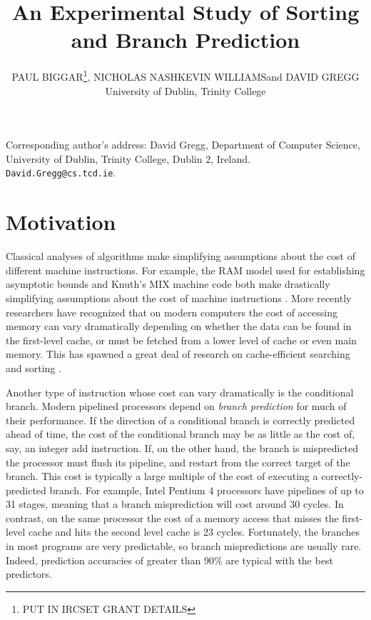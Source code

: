 \documentclass[acmtocl]{acmtrans2m}
\title{An Experimental Study of Sorting and Branch Prediction}
\author{
PAUL BIGGAR\footnote[1]{PUT IN IRCSET GRANT DETAILS}, NICHOLAS NASH\footnotemark[1] KEVIN WILLIAMS\footnotemark[1] and DAVID GREGG
\\University of Dublin, Trinity College
}
\begin{document}
\begin{bottomstuff}
Corresponding author's address: David Gregg, Department of Computer
Science, University of Dublin, Trinity College, Dublin 2, Ireland. {\tt
David.Gregg@cs.tcd.ie}.
\end{bottomstuff}

\maketitle

\section{Motivation}
Classical analyses of algorithms make simplifying assumptions about
the cost of different machine instructions. For example, the RAM model used for 
establishing asymptotic bounds and Knuth's MIX 
machine code both make drastically simplifying assumptions about the cost of
machine instructions \cite{KnuthVol1_97}. 
More
recently researchers have recognized that on modern computers the cost
of accessing memory can vary dramatically depending on whether the
data can be found in the first-level cache, or must be fetched from a
lower level of cache or even main memory.  This has spawned a great
deal of research on cache-efficient searching and sorting \cite{Nyberg+94,Agarwal96,LaMarca96b,LaMarca96a,LaMarca97,Xiao+00,Rahman+01,Wickremesinghe+02}.

Another type of instruction whose cost can vary dramatically is the
conditional branch. Modern pipelined processors depend on \emph{branch
prediction} for much of their performance.  If the direction of a
conditional branch is correctly predicted ahead of time, the cost of
the conditional branch may be as little as the cost of, say, an
integer add instruction. If, on the other hand, the branch is
mispredicted the processor must flush its pipeline, and restart
from the correct target of the branch. This cost is typically a large
multiple of the cost of executing a correctly-predicted branch. For
example, Intel Pentium 4 processors \cite{Intel248966-010,Intel249438-01} have pipelines of up 
to 31 stages,
meaning that a branch misprediction will cost around 30 cycles.  In
contrast, on the same processor the cost of a memory access that
misses the first-level cache and hits the second level cache is 23
cycles. Fortunately, the branches in most programs are very
predictable, so branch mispredictions are usually rare. Indeed, prediction
accuracies of greater than 90\% are typical \cite{Uht+97} with the
best predictors.
\end{document}
